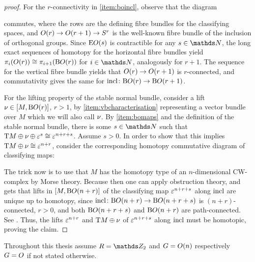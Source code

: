 \begin{Lem}
\begin{proof}[proof]
    For the $r$-connectivity in \ref{item:boincl}, observe that
    the diagram
    \begin{center}
    \end{center}
    commutes, where the rows are the defining fibre bundles for the
    classifying spaces, and $O(r)\to O(r+1)\to S^{r}$
    is the well-known fibre bundle of the inclusion of orthogonal groups.
    Since $\mathrm{E}O(s)$ is contractible for any $s\in\Nat$, 
    the long exact sequences of homotopy for the horizontal fibre bundles yield
    $\pi_i(O(r))\cong\pi_{i+1}(\mathrm{B}O(r))$ for $i\in\Nat$, analogously for $r+1$.
    The sequence for the vertical fibre bundle yields that
    $O(r)\to O(r+1)$ is $r$-connected, and commutativity gives
    the same for $\mathrm{incl}\colon\mathrm{B}O(r)\to\mathrm{B}O(r+1)$.
    
    For the lifting property of the stable normal bundle, consider a
    lift $\nu_{}\in[M,\mathrm{B}O(r)]$, $r>1$, by \ref{item:vbcharacterisation}
    representing a vector bundle over $M$ which we will also call
    $\nu_{}$. By \ref{item:bomaps} and the definition
    of the stable normal bundle, there is some $s\in\Nat$
    such that $\mathrm{T}M\oplus\nu_{}\oplus\varepsilon^s\cong\varepsilon^{n+r+s}$.
    Assume $s>0$.
    In order to show that this implies
    $\mathrm{T}M\oplus\nu_{}\cong\varepsilon^{n+r}$, consider the corresponding
    homotopy commutative diagram of classifying maps:
    \begin{center}
    \end{center}
    The trick now is to use that $M$ has the homotopy type of an
    $n$-dimensional CW-complex by Morse theory. Because then one can
    apply obstruction theory, and gets that lifts in $[M,\mathrm{B}O(n+r)]$ of
    the classifying map $\varepsilon^{n+r+s}$ along $\mathrm{incl}$ are unique up
    to homotopy, since $\mathrm{incl}\colon\mathrm{B}O(n+r)\to\mathrm{B}O(n+r+s)$ is
    $(n+r)$-connected, $r>0$, and both $\mathrm{B}O(n+r+s)$ and $\mathrm{B}O(n+r)$ are
    path-connected. See \forexample \cite[Lemma~4.6]{hatcher}.
    Thus, the lifts $\varepsilon^{n+r}$ and $\mathrm{T}M\oplus\nu_{}$ of
    $\varepsilon^{n+r+s}$ along $\mathrm{incl}$ must be homotopic, proving the
    claim.
  \end{proof}
\end{Lem}
\begin{Not}
  Throughout this thesis assume $R=\Zmod2$ and $G=O(n)$
  respectively $G=O$ if not stated otherwise.
\end{Not}

